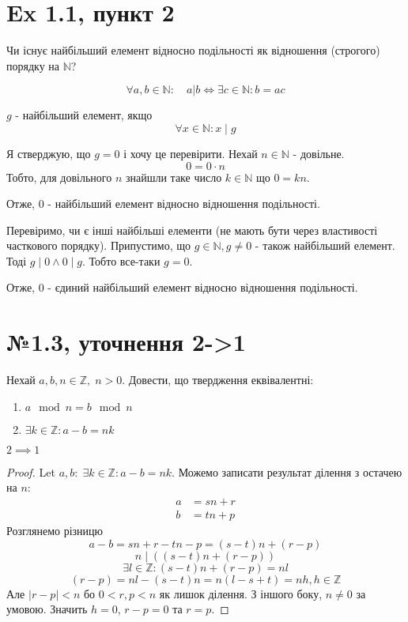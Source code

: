 \documentclass[11pt, a4paper]{article} %
\newcommand{\N}{\mathbb{N}}
\newcommand{\Z}{\mathbb{Z}}
\begin{document}
\section*{Ex 1.1, пункт 2}
\begin{mdframed}
    Чи існує найбільший елемент відносно подільності як відношення (строгого) порядку на $\N$?
\end{mdframed}

\begin{mdframed}[backgroundcolor=blue!10]
    \[\forall a,b \in \N: \quad a|b \iff \exists c\in \N: b=ac \]
\end{mdframed}

$g$ - найбільший елемент, якщо
\[\forall x \in \N: x \mid g \]

Я стверджую, що $g=0$ і хочу це перевірити. Нехай $n\in\N$ - довільне.
\[0 = 0 \cdot n\]
Тобто, для довільного $n$ знайшли таке число $k\in\N$ що $0 = kn$.

Отже, $0$ - найбільший елемент відносно відношення подільності.

Перевіримо, чи є інші найбільші елементи (не мають бути через властивості часткового порядку).
Припустимо, що $g\in\N, g\ne 0$ - також найбільший елемент.\\
Тоді $g\mid 0 \land 0 \mid g$. Тобто все-таки $g=0$.

Отже, $0$ - єдиний найбільший елемент відносно відношення подільності.

\section*{№1.3, уточнення 2->1}
\begin{mdframed}
    Нехай $a,b,n \in \Z, \; n>0$.
    Довести, що твердження еквівалентні:
    \begin{enumerate}
        \item $a \mod n = b \mod n$
        \item $\exists k\in\Z: a-b = nk$
    \end{enumerate}
\end{mdframed}

$2 \implies 1$
\begin{proof}
    Let $a,b: \; \exists k\in\Z: a-b = nk$.
    Можемо записати результат ділення з остачею на $n$:
    \begin{align*}
        a &= sn + r \\
        b &= tn + p
    \end{align*}
    Розглянемо різницю
    \[a-b = sn+r - tn - p = (s-t)n + (r-p)\]
    \[n\;|\;\left((s-t)n + (r-p)\right)\]
    \[\exists l\in\Z: (s-t)n + (r-p) = nl\]
    \[(r-p) = nl - (s-t)n = n(l-s+t) = nh, h\in\Z\]
    Але $|r-p| < n$ бо $0<r,p<n$ як лишок ділення.
    З іншого боку, $n\ne 0$ за умовою.
    Значить $h=0$, $r-p=0$ та $r=p$.
\end{proof}
\end{document}
